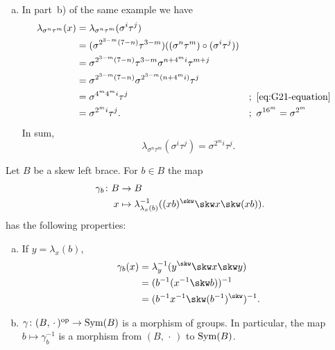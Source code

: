 \begin{xmpls}
\begin{enumerate}[a),font=\upshape]
        \item In part~b) of the same example we have
        \begin{align*}
            \lambda_{\sigma^n\tau^m}(x)
                &=\lambda_{\sigma^n\tau^m}(\sigma^i\tau^j)\\
                &= (\sigma^{2^{3-m}(7-n)}\tau^{3-m})
                    ((\sigma^n\tau^m)\circ(\sigma^i\tau^j))\\
                &=  \sigma^{2^{3-m}(7-n)}\tau^{3-m}
                    \sigma^{n+4^mi}\tau^{m+j}\\
                &= \sigma^{2^{3-m}(7-n)}\sigma^{2^{3-m}
                    (n+4^mi)}\tau^j\\
                &= \sigma^{4^m4^mi}\tau^j
                    &&;\ \eqref{eq:G21-equation}\\
                &= \sigma^{2^mi}\tau^j.
                    &&;\ \sigma^{16^m}=\sigma^{2^m}
        \end{align*}
        In sum,
        \begin{equation}\label{eq:lambda-21}
            \lambda_{\sigma^n\tau^m}(\sigma^i\tau^j)
                = \sigma^{2^mi}\tau^j.
        \end{equation}
    \end{enumerate}
\end{xmpls}

\begin{lem}\label{lem:ybe-gamma}
    Let $B$ be a skew left brace. For $b\in B$ the map
    \begin{align*}
        \gamma_b\colon B&\to B\\
        x&\mapsto \lambda^{-1}_{\lambda_x(b)}((xb)^\skw\skw x\skw(xb)).
    \end{align*}
    has the following properties:
    \begin{enumerate}[a),font=\upshape]
        \item If $y=\lambda_x(b)$,
            \begin{align}
                \gamma_b(x) &= \lambda^{-1}_y(y^\skw\skw x\skw y)
                        \label{eq:gamma-alt-1}\\
                    &= (b^{-1}(x^{-1}\skw b))^{-1}
                        \label{eq:gamma-alt-2}\\
                    &= (b^{-1}x^{-1}\skw(b^{-1})^\skw)^{-1}.
                        \label{eq:gamma-alt-3}
            \end{align}

            \item $\gamma\colon(B,\,\cdot\,)^{\operatorname{op}}\to{\rm Sym}(B)$ is a morphism of groups. In particular, the map $b\mapsto\gamma_b^{-1}$ is a morphism from $(B,\,\cdot\,)$ to ${\rm Sym}(B)$.
    \end{enumerate}
\end{lem}


